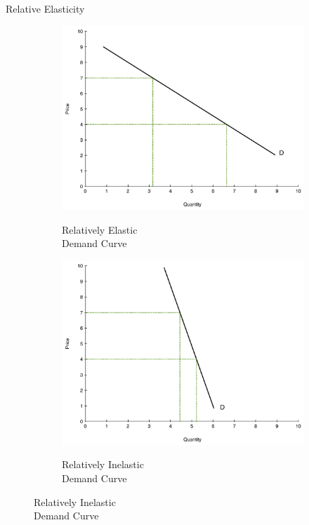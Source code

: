 \documentclass[xcolor={dvipsnames},pdf, hyperref={colorlinks=true, citecolor=ForestGreen, linkcolor=BlueViolet, urlcolor=Magenta}]{beamer}
\newcommand{\blank}[0]{}
\newcommand{\ddp}[1]{{\textcolor{ForestGreen}{#1}}}
\begin{document}
\begin{frame}{Relative Elasticity}

		\begin{figure}[H]
			\centering
			\caption{Comparing Demand Elasticities}
			\blank\blank\blank\blank
			\label{fig1}
			\begin{subfigure}{.5\textwidth}
				\ddp{\includegraphics[scale=.25]{notes04_plot1.pdf}}
				\caption{Relatively Elastic\\ Demand Curve}
			\end{subfigure}%
			\begin{subfigure}{.5\textwidth}
				\centering
				\ddp{\includegraphics[scale=.25]{notes04_plot2.pdf}}
				\caption{Relatively Inelastic \\ Demand Curve}
			\end{subfigure}
		\end{figure}
	
\end{frame}
\end{document}
